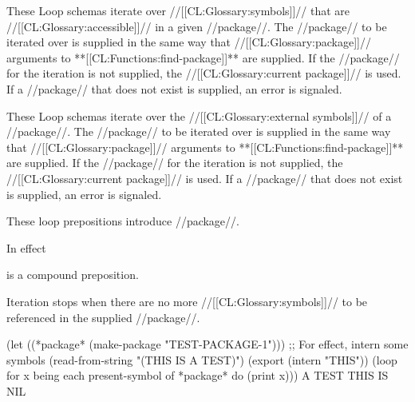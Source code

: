 These Loop schemas iterate over //[[CL:Glossary:symbols]]// that are
//[[CL:Glossary:accessible]]// in a given //package//.  
The //package// to be iterated over is supplied in the same way
that //[[CL:Glossary:package]]// arguments to **[[CL:Functions:find-package]]** are supplied.
If the //package// for the iteration is not supplied, 
the //[[CL:Glossary:current package]]// is used.
If a //package// that does not exist is supplied, 
an error  is signaled.
 
 
These Loop schemas iterate over the //[[CL:Glossary:external symbols]]// of a //package//.
The //package// to be iterated over is supplied in the same way
that //[[CL:Glossary:package]]// arguments to **[[CL:Functions:find-package]]** are supplied.
If the //package// for the iteration is not supplied, 
the //[[CL:Glossary:current package]]// is used.
If a //package// that does not exist is supplied, 
an error  is signaled.
 
 
These loop prepositions introduce //package//.
 
\endlist


In effect 
                                      







is a compound preposition.

Iteration stops when there are no more //[[CL:Glossary:symbols]]// to be referenced 
in the supplied //package//.
 

\code
 (let ((*package* (make-package "TEST-PACKAGE-1")))
   ;; For effect, intern some symbols
   (read-from-string "(THIS IS A TEST)")
   (export (intern "THIS"))
   (loop for x being each present-symbol of *package*
          do (print x)))
\OUT A 
\OUT TEST 
\OUT THIS
\OUT IS 
\EV NIL
\endcode


